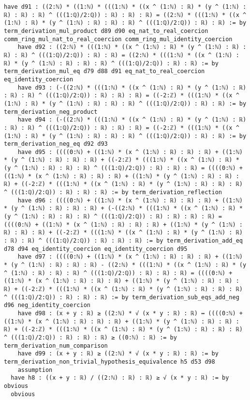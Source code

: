 \documentclass{article}
\begin{document}
\begin{tcolorbox}[colback=white!10, width=\linewidth]
\begin{lstlisting}[language=Lean4]
    have d91 : ((2:ℕ) * ((1:ℕ) * (((1:ℕ) * ((x ^ (1:ℕ) : ℝ) * (y ^ (1:ℕ) : ℝ) : ℝ) : ℝ) ^ (((1:ℚ)/2:ℚ)) : ℝ) : ℝ) : ℝ) = ((2:ℕ) * (((1:ℕ) * ((x ^ (1:ℕ) : ℝ) * (y ^ (1:ℕ) : ℝ) : ℝ) : ℝ) ^ (((1:ℚ)/2:ℚ)) : ℝ) : ℝ) := by term_derivation_mul_product d89 d90 eq_nat_to_real_coercion comm_ring_mul_nat_to_real_coercion comm_ring_mul_identity_coercion
    have d92 : ((2:ℕ) * (((1:ℕ) * ((x ^ (1:ℕ) : ℝ) * (y ^ (1:ℕ) : ℝ) : ℝ) : ℝ) ^ (((1:ℚ)/2:ℚ)) : ℝ) : ℝ) = ((2:ℕ) * (((1:ℕ) * ((x ^ (1:ℕ) : ℝ) * (y ^ (1:ℕ) : ℝ) : ℝ) : ℝ) ^ (((1:ℚ)/2:ℚ)) : ℝ) : ℝ) := by term_derivation_mul_eq d79 d88 d91 eq_nat_to_real_coercion eq_identity_coercion
    have d93 : (-((2:ℕ) * (((1:ℕ) * ((x ^ (1:ℕ) : ℝ) * (y ^ (1:ℕ) : ℝ) : ℝ) : ℝ) ^ (((1:ℚ)/2:ℚ)) : ℝ) : ℝ) : ℝ) = ((-2:ℤ) * (((1:ℕ) * ((x ^ (1:ℕ) : ℝ) * (y ^ (1:ℕ) : ℝ) : ℝ) : ℝ) ^ (((1:ℚ)/2:ℚ)) : ℝ) : ℝ) := by term_derivation_neg_product
    have d94 : (-((2:ℕ) * (((1:ℕ) * ((x ^ (1:ℕ) : ℝ) * (y ^ (1:ℕ) : ℝ) : ℝ) : ℝ) ^ (((1:ℚ)/2:ℚ)) : ℝ) : ℝ) : ℝ) = ((-2:ℤ) * (((1:ℕ) * ((x ^ (1:ℕ) : ℝ) * (y ^ (1:ℕ) : ℝ) : ℝ) : ℝ) ^ (((1:ℚ)/2:ℚ)) : ℝ) : ℝ) := by term_derivation_neg_eq d92 d93
    have d95 : ((((0:ℕ) + ((1:ℕ) * (x ^ (1:ℕ) : ℝ) : ℝ) : ℝ) + ((1:ℕ) * (y ^ (1:ℕ) : ℝ) : ℝ) : ℝ) + ((-2:ℤ) * (((1:ℕ) * ((x ^ (1:ℕ) : ℝ) * (y ^ (1:ℕ) : ℝ) : ℝ) : ℝ) ^ (((1:ℚ)/2:ℚ)) : ℝ) : ℝ) : ℝ) = ((((0:ℕ) + ((1:ℕ) * (x ^ (1:ℕ) : ℝ) : ℝ) : ℝ) + ((1:ℕ) * (y ^ (1:ℕ) : ℝ) : ℝ) : ℝ) + ((-2:ℤ) * (((1:ℕ) * ((x ^ (1:ℕ) : ℝ) * (y ^ (1:ℕ) : ℝ) : ℝ) : ℝ) ^ (((1:ℚ)/2:ℚ)) : ℝ) : ℝ) : ℝ) := by term_derivation_reflection
    have d96 : ((((0:ℕ) + ((1:ℕ) * (x ^ (1:ℕ) : ℝ) : ℝ) : ℝ) + ((1:ℕ) * (y ^ (1:ℕ) : ℝ) : ℝ) : ℝ) + (-((2:ℕ) * (((1:ℕ) * ((x ^ (1:ℕ) : ℝ) * (y ^ (1:ℕ) : ℝ) : ℝ) : ℝ) ^ (((1:ℚ)/2:ℚ)) : ℝ) : ℝ) : ℝ) : ℝ) = ((((0:ℕ) + ((1:ℕ) * (x ^ (1:ℕ) : ℝ) : ℝ) : ℝ) + ((1:ℕ) * (y ^ (1:ℕ) : ℝ) : ℝ) : ℝ) + ((-2:ℤ) * (((1:ℕ) * ((x ^ (1:ℕ) : ℝ) * (y ^ (1:ℕ) : ℝ) : ℝ) : ℝ) ^ (((1:ℚ)/2:ℚ)) : ℝ) : ℝ) : ℝ) := by term_derivation_add_eq d78 d94 eq_identity_coercion eq_identity_coercion d95
    have d97 : ((((0:ℕ) + ((1:ℕ) * (x ^ (1:ℕ) : ℝ) : ℝ) : ℝ) + ((1:ℕ) * (y ^ (1:ℕ) : ℝ) : ℝ) : ℝ) - ((2:ℕ) * (((1:ℕ) * ((x ^ (1:ℕ) : ℝ) * (y ^ (1:ℕ) : ℝ) : ℝ) : ℝ) ^ (((1:ℚ)/2:ℚ)) : ℝ) : ℝ) : ℝ) = ((((0:ℕ) + ((1:ℕ) * (x ^ (1:ℕ) : ℝ) : ℝ) : ℝ) + ((1:ℕ) * (y ^ (1:ℕ) : ℝ) : ℝ) : ℝ) + ((-2:ℤ) * (((1:ℕ) * ((x ^ (1:ℕ) : ℝ) * (y ^ (1:ℕ) : ℝ) : ℝ) : ℝ) ^ (((1:ℚ)/2:ℚ)) : ℝ) : ℝ) : ℝ) := by term_derivation_sub_eqs_add_neg d96 neg_identity_coercion
    have d98 : (x + y : ℝ) ≥ ((2:ℕ) * √ (x * y : ℝ) : ℝ) ↔ ((((0:ℕ) + ((1:ℕ) * (x ^ (1:ℕ) : ℝ) : ℝ) : ℝ) + ((1:ℕ) * (y ^ (1:ℕ) : ℝ) : ℝ) : ℝ) + ((-2:ℤ) * (((1:ℕ) * ((x ^ (1:ℕ) : ℝ) * (y ^ (1:ℕ) : ℝ) : ℝ) : ℝ) ^ (((1:ℚ)/2:ℚ)) : ℝ) : ℝ) : ℝ) ≥ ((0:ℕ) : ℝ) := by term_derivation_num_comparison
    have d99 : (x + y : ℝ) ≥ ((2:ℕ) * √ (x * y : ℝ) : ℝ) := by term_derivation_non_trivial_hypothesis_equivalence h5 d53 d98
    assumption
  have h8 : ((x + y : ℝ) / ((2:ℕ) : ℝ) : ℝ) ≥ √ (x * y : ℝ) := by obvious
  obvious

\end{lstlisting}
\end{tcolorbox}
\end{document}
